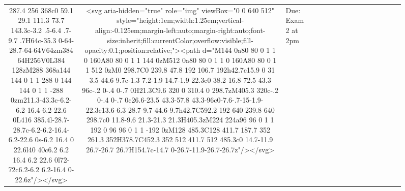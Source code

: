 \documentclass[
]{article}
\begin{document}
\begin{figure*}
\begin{longtable*}{cclllccccccccccl}
287.4 256 368c0 59.1 29.1 111.3 73.7 143.3c-3.2 .5-6.4 .7-9.7 .7H64c-35.3 0-64-28.7-64-64V64zm384 64H256V0L384 128zM288 368a144 144 0 1 1 288 0 144 144 0 1 1 -288 0zm211.3-43.3c-6.2-6.2-16.4-6.2-22.6 0L416 385.4l-28.7-28.7c-6.2-6.2-16.4-6.2-22.6 0s-6.2 16.4 0 22.6l40 40c6.2 6.2 16.4 6.2 22.6 0l72-72c6.2-6.2 6.2-16.4 0-22.6z"/></svg> & <svg aria-hidden="true" role="img" viewBox="0 0 640 512" style="height:1em;width:1.25em;vertical-align:-0.125em;margin-left:auto;margin-right:auto;font-size:inherit;fill:currentColor;overflow:visible;fill-opacity:0.1;position:relative;"><path d="M144 0a80 80 0 1 1 0 160A80 80 0 1 1 144 0zM512 0a80 80 0 1 1 0 160A80 80 0 1 1 512 0zM0 298.7C0 239.8 47.8 192 106.7 192h42.7c15.9 0 31 3.5 44.6 9.7c-1.3 7.2-1.9 14.7-1.9 22.3c0 38.2 16.8 72.5 43.3 96c-.2 0-.4 0-.7 0H21.3C9.6 320 0 310.4 0 298.7zM405.3 320c-.2 0-.4 0-.7 0c26.6-23.5 43.3-57.8 43.3-96c0-7.6-.7-15-1.9-22.3c13.6-6.3 28.7-9.7 44.6-9.7h42.7C592.2 192 640 239.8 640 298.7c0 11.8-9.6 21.3-21.3 21.3H405.3zM224 224a96 96 0 1 1 192 0 96 96 0 1 1 -192 0zM128 485.3C128 411.7 187.7 352 261.3 352H378.7C452.3 352 512 411.7 512 485.3c0 14.7-11.9 26.7-26.7 26.7H154.7c-14.7 0-26.7-11.9-26.7-26.7z"/></svg> & Due: Exam 2 at 2pm \\ 

\end{longtable*}
\end{figure*}
\end{document}
